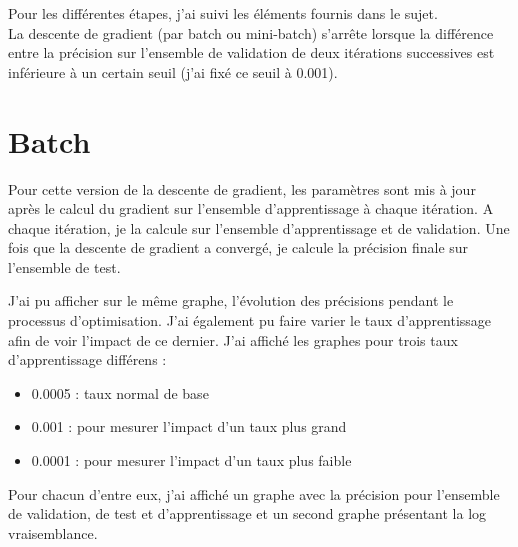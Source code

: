 \documentclass[12pt]{article}
\begin{document}
Pour les différentes étapes, j'ai suivi les éléments fournis dans le sujet. \\
La descente de gradient (par batch ou mini-batch) s'arrête lorsque la différence entre la précision sur l'ensemble de validation de deux itérations successives est inférieure à un certain seuil (j'ai fixé ce seuil à 0.001).

\section{Batch}
Pour cette version de la descente de gradient, les paramètres sont mis à jour après le calcul du gradient sur l'ensemble d'apprentissage à chaque itération.
A chaque itération, je la calcule sur l'ensemble d'apprentissage et de validation. Une fois que la descente de gradient a convergé, je calcule la précision finale sur l'ensemble de test.

J'ai pu afficher sur le même graphe, l'évolution des précisions pendant le processus d'optimisation. J'ai également pu faire varier le taux d'apprentissage afin de voir l'impact de ce dernier.
 J'ai affiché les graphes pour trois taux d'apprentissage différens : 
\begin{itemize}
\item 0.0005 : taux normal de base
\item 0.001 : pour mesurer l'impact d'un taux plus grand
\item 0.0001 : pour mesurer l'impact d'un taux plus faible
\end{itemize}
Pour chacun d'entre eux, j'ai affiché un graphe avec la précision pour l'ensemble de validation, de test et d'apprentissage et un second graphe présentant la log vraisemblance. 
\end{document}
